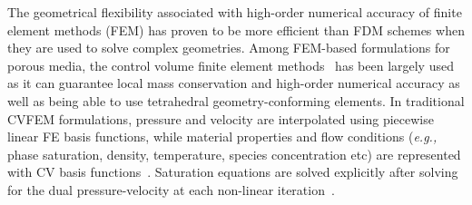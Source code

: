 \documentclass[preprint,authoryear,12pt]{elsarticle}
\newcommand{\eg}{{\it e.g., }}
\begin{document}
\medskip
The geometrical flexibility associated with high-order numerical accuracy of finite element methods (FEM) has proven to be more efficient than FDM schemes when they are used to solve complex geometries. %
Among FEM-based formulations for porous media, the control volume finite element methods~\citep[CVFEM,][]{fung_1992} has been largely used as it can guarantee local mass conservation and high-order numerical accuracy as well as being able to use tetrahedral geometry-conforming elements. In traditional CVFEM formulations, pressure and velocity are interpolated using piecewise linear FE basis functions, %
while material properties and flow conditions (\eg phase saturation, density, temperature, species concentration etc) are represented with CV basis functions~\citep{voller_2009}. Saturation equations are solved explicitly after solving for the dual pressure-velocity at each non-linear iteration~\citep[a detailed description of the implicit pressure explicit saturation, IMPES, formulation can be found in][]{chen_2006,lux_2012}.

\end{document}
